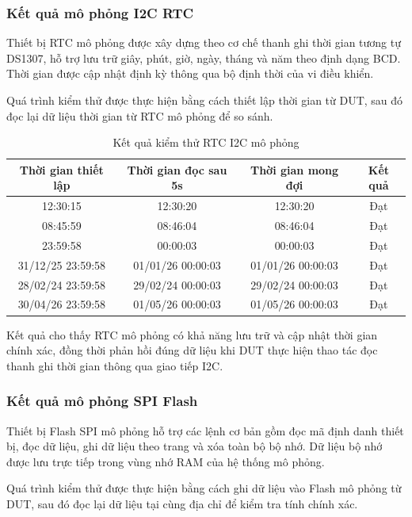 \subsubsection{Kết quả mô phỏng I2C RTC}

Thiết bị RTC mô phỏng được xây dựng theo cơ chế thanh ghi thời gian tương tự DS1307, hỗ trợ lưu trữ giây, phút, giờ, ngày, tháng và năm theo định dạng BCD. Thời gian được cập nhật định kỳ thông qua bộ định thời của vi điều khiển.

Quá trình kiểm thử được thực hiện bằng cách thiết lập thời gian từ DUT, sau đó đọc lại dữ liệu thời gian từ RTC mô phỏng để so sánh.

\begin{table}[H]
\centering
\caption{Kết quả kiểm thử RTC I2C mô phỏng}
\begin{tabular}{|c|c|c|c|}
\hline
\textbf{Thời gian thiết lập} & \textbf{Thời gian đọc sau 5s} & \textbf{Thời gian mong đợi} & \textbf{Kết quả} \\ \hline
12:30:15 & 12:30:20 & 12:30:20 & Đạt \\ \hline
08:45:59 & 08:46:04 & 08:46:04 & Đạt \\ \hline
23:59:58 & 00:00:03 & 00:00:03 & Đạt \\ \hline
31/12/25 23:59:58 & 01/01/26 00:00:03 & 01/01/26 00:00:03 & Đạt \\ \hline
28/02/24 23:59:58 & 29/02/24 00:00:03 & 29/02/24 00:00:03 & Đạt \\ \hline
30/04/26 23:59:58 & 01/05/26 00:00:03 & 01/05/26 00:00:03 & Đạt \\ \hline
\end{tabular}
\end{table}

Kết quả cho thấy RTC mô phỏng có khả năng lưu trữ và cập nhật thời gian chính xác, đồng thời phản hồi đúng dữ liệu khi DUT thực hiện thao tác đọc thanh ghi thời gian thông qua giao tiếp I2C.

\subsubsection{Kết quả mô phỏng SPI Flash}

Thiết bị Flash SPI mô phỏng hỗ trợ các lệnh cơ bản gồm đọc mã định danh thiết bị, đọc dữ liệu, ghi dữ liệu theo trang và xóa toàn bộ bộ nhớ. Dữ liệu bộ nhớ được lưu trực tiếp trong vùng nhớ RAM của hệ thống mô phỏng.

Quá trình kiểm thử được thực hiện bằng cách ghi dữ liệu vào Flash mô phỏng từ DUT, sau đó đọc lại dữ liệu tại cùng địa chỉ để kiểm tra tính chính xác.

